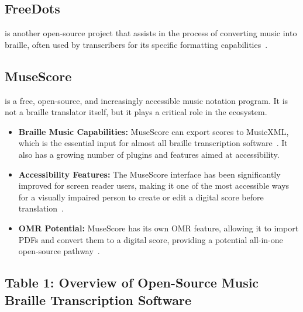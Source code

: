 \subsection{FreeDots}\label{ch10:ssec:freedots}
 is another open-source project that assists in the process of converting music into braille, often used by transcribers for its specific formatting capabilities~\supercite{blindguru-freedots}.

\subsection{MuseScore}\label{ch10:ssec:musescore}
 is a free, open-source, and increasingly accessible music notation program. It is not a braille translator itself, but it plays a critical role in the ecosystem.
\begin{itemize}
	\item \textbf{Braille Music Capabilities:} MuseScore can export scores to \gls{MusicXML}, which is the essential input for almost all braille transcription software~\supercite{musescore-braille}. It also has a growing number of plugins and features aimed at accessibility.
	\item \textbf{Accessibility Features:} The MuseScore interface has been significantly improved for screen reader users, making it one of the most accessible ways for a visually impaired person to create or edit a digital score before translation~\supercite{musescore-accessibility, soundwithoutsight-musescore}.
	\item \textbf{OMR Potential:} MuseScore has its own \gls{OMR} feature, allowing it to import PDFs and convert them to a digital score, providing a potential all-in-one open-source pathway~\supercite{musescore-omr}.
\end{itemize}

\subsection{Table 1: Overview of Open-Source Music Braille Transcription Software}\label{ch10:ssec:table-open-source}

